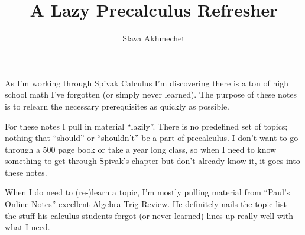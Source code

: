 \documentclass{article}
\title{A Lazy Precalculus Refresher}
\author{Slava Akhmechet}
\begin{document}
\maketitle

As I'm working through Spivak Calculus I'm discovering there is a ton
of high school math I've forgotten (or simply never learned). The
purpose of these notes is to relearn the necessary prerequisites as
quickly as possible.

\vs

For these notes I pull in material ``lazily''. There is no predefined
set of topics; nothing that ``should'' or ``shouldn't'' be a part of
precalculus. I don't want to go through a 500 page book or take a year
long class, so when I need to know something to get through Spivak's
chapter but don't already know it, it goes into these notes.

\vs

When I do need to (re-)learn a topic, I'm mostly pulling material from
``Paul's Online Notes'' excellent
\href{https://tutorial.math.lamar.edu/Extras/AlgebraTrigReview/AlgebraTrig.aspx}{Algebra
  Trig Review}. He definitely nails the topic list-- the stuff his
calculus students forgot (or never learned) lines up really well with
what I need.


\tableofcontents

\clearpage

\end{document}
